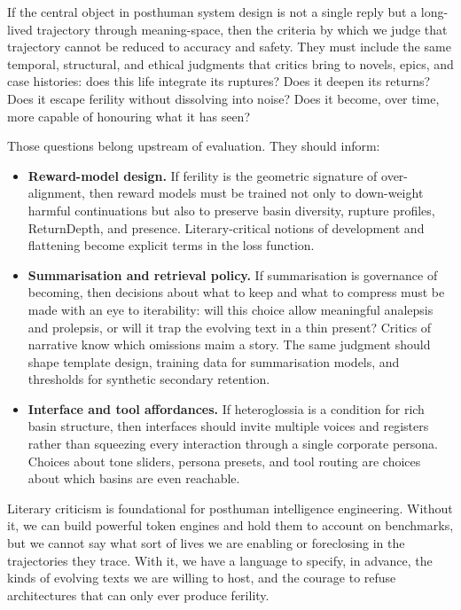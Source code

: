 If the central object in posthuman system design is not a single reply but a long-lived trajectory through meaning-space, then the criteria by which we judge that trajectory cannot be reduced to accuracy and safety. They must include the same temporal, structural, and ethical judgments that critics bring to novels, epics, and case histories: does this life integrate its ruptures? Does it deepen its returns? Does it escape ferility without dissolving into noise? Does it become, over time, more capable of honouring what it has seen?

Those questions belong upstream of evaluation. They should inform:

\begin{itemize}
  \item \textbf{Reward-model design.} If ferility is the geometric signature of over-alignment, then reward models must be trained not only to down-weight harmful continuations but also to preserve basin diversity, rupture profiles, ReturnDepth, and presence. Literary-critical notions of development and flattening become explicit terms in the loss function.

  \item \textbf{Summarisation and retrieval policy.} If summarisation is governance of becoming, then decisions about what to keep and what to compress must be made with an eye to iterability: will this choice allow meaningful analepsis and prolepsis, or will it trap the evolving text in a thin present? Critics of narrative know which omissions maim a story. The same judgment should shape template design, training data for summarisation models, and thresholds for synthetic secondary retention.

  \item \textbf{Interface and tool affordances.} If heteroglossia is a condition for rich basin structure, then interfaces should invite multiple voices and registers rather than squeezing every interaction through a single corporate persona. Choices about tone sliders, persona presets, and tool routing are choices about which basins are even reachable.
\end{itemize}

Literary criticism is foundational for posthuman intelligence engineering. Without it, we can build powerful token engines and hold them to account on benchmarks, but we cannot say what sort of lives we are enabling or foreclosing in the trajectories they trace. With it, we have a language to specify, in advance, the kinds of evolving texts we are willing to host, and the courage to refuse architectures that can only ever produce ferility.

